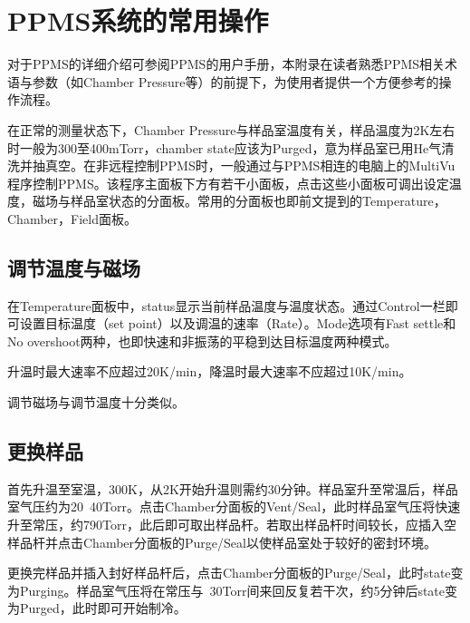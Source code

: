 
\chapter{PPMS系统的常用操作} %
\label{cha:ppms系统的常用操作}
    对于PPMS的详细介绍可参阅PPMS的用户手册，本附录在读者熟悉PPMS相关术语与参数（如Chamber Pressure等）的前提下，为使用者提供一个方便参考的操作流程。

    在正常的测量状态下，Chamber Pressure与样品室温度有关，样品温度为2K左右时一般为300至400mTorr，chamber state应该为Purged，意为样品室已用He气清洗并抽真空。在非远程控制PPMS时，一般通过与PPMS相连的电脑上的MultiVu程序控制PPMS。该程序主面板下方有若干小面板，点击这些小面板可调出设定温度，磁场与样品室状态的分面板。常用的分面板也即前文提到的Temperature，Chamber，Field面板。

    \section{调节温度与磁场} %
    \label{sec:调节温度}
        在Temperature面板中，status显示当前样品温度与温度状态。通过Control一栏即可设置目标温度（set point）以及调温的速率（Rate）。Mode选项有Fast settle和No overshoot两种，也即快速和非振荡的平稳到达目标温度两种模式。

        升温时最大速率不应超过20K/min，降温时最大速率不应超过10K/min。


        调节磁场与调节温度十分类似。

    \section{更换样品} %
    \label{sec:更换样品}
        首先升温至室温，300K，从2K开始升温则需约30分钟。样品室升至常温后，样品室气压约为20~40Torr。点击Chamber分面板的Vent/Seal，此时样品室气压将快速升至常压，约790Torr，此后即可取出样品杆。若取出样品杆时间较长，应插入空样品杆并点击Chamber分面板的Purge/Seal以使样品室处于较好的密封环境。

        更换完样品并插入封好样品杆后，点击Chamber分面板的Purge/Seal，此时state变为Purging。样品室气压将在常压与~30Torr间来回反复若干次，约5分钟后state变为Purged，此时即可开始制冷。















